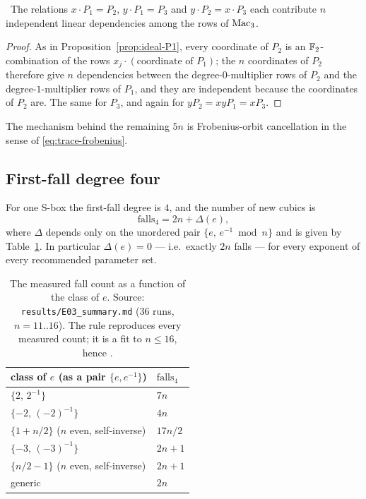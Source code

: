 \begin{proposition}\label{prop:trivial-syz}
\Proved\ The relations $x\cdot P_1=P_2$, $y\cdot P_1=P_3$ and $y\cdot P_2=x\cdot P_3$ each contribute
$n$ independent linear dependencies among the rows of $\mathrm{Mac}_3$.
\end{proposition}
\begin{proof}
As in Proposition~\ref{prop:ideal-P1}, every coordinate of $P_2$ is an $\mathbb{F}_2$-combination of the rows
$x_j\cdot(\text{coordinate of }P_1)$; the $n$ coordinates of $P_2$ therefore give $n$ dependencies
between the degree-$0$-multiplier rows of $P_2$ and the degree-$1$-multiplier rows of $P_1$, and they
are independent because the coordinates of $P_2$ are. The same for $P_3$, and again for
$yP_2=xyP_1=xP_3$.
\end{proof}

The mechanism behind the remaining $5n$ is Frobenius-orbit cancellation in the sense of
\eqref{eq:trace-frobenius}. 

\subsection{First-fall degree four}\label{sec:falls}

\begin{theorem}\label{thm:firstfall}
 For one S-box the first-fall degree is $4$,
and the number of new cubics is
\[
  \mathrm{falls}_4 = 2n+\Delta(e),
\]
where $\Delta$ depends only on the unordered pair $\{e,\,e^{-1}\bmod n\}$ and is given by
Table~\ref{tab:classes}. In particular $\Delta(e)=0$ --- i.e.\ exactly $2n$ falls --- for every
exponent of every recommended parameter set.
\end{theorem}

\begin{table}[t]\centering
\caption{The measured fall count as a function of the class of $e$. Source:
\texttt{results/E03\_summary.md} (36 runs, $n=11..16$). The rule reproduces every measured count;
it is a fit to $n\le16$, hence \Conj.}\label{tab:classes}
\begin{tabular}{ll}
\toprule
class of $e$ (as a pair $\{e,e^{-1}\}$) & $\mathrm{falls}_4$\\
\midrule
$\{2,\,2^{-1}\}$ & $7n$\\
$\{-2,\,(-2)^{-1}\}$ & $4n$\\
$\{1+n/2\}$ ($n$ even, self-inverse) & $17n/2$\\
$\{-3,\,(-3)^{-1}\}$ & $2n+1$\\
$\{n/2-1\}$ ($n$ even, self-inverse) & $2n+1$\\
generic & $2n$\\
\bottomrule
\end{tabular}
\end{table}

